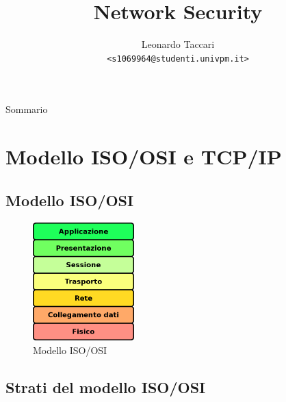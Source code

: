 \documentclass{beamer}
\title{Network Security}
\author[leot]{Leonardo Taccari \\ {\footnotesize \texttt{<s1069964@studenti.univpm.it>}}}
\date{}
\begin{document}
\begin{frame}
\maketitle
\end{frame}

\begin{frame}{Sommario}
\tableofcontents
\end{frame}

\section{Modello ISO/OSI e TCP/IP}
\subsection{Modello ISO/OSI}
\begin{frame}{\insertsection}
\begin{figure}
\includegraphics[width=0.35\textwidth]{imgs/01-iso-osi.drawio.png}
\caption{Modello ISO/OSI}
\end{figure}
\end{frame}

\subsection{Strati del modello ISO/OSI}
\end{document}
